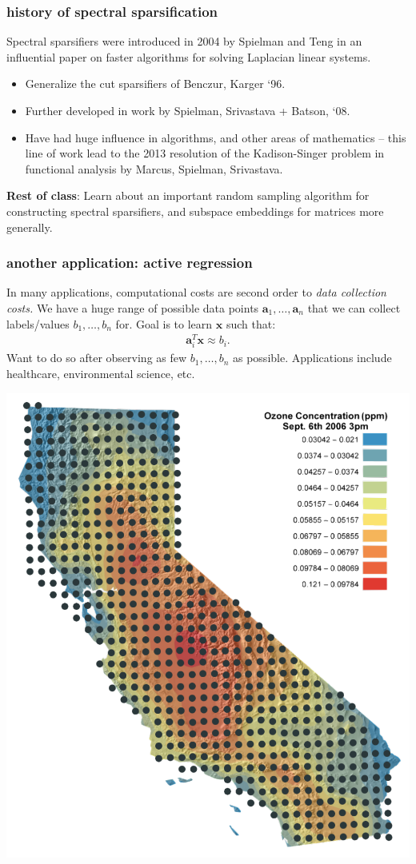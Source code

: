 \documentclass[compress]{beamer}
\newcommand{\bv}[1]{\mathbf{#1}}
\begin{document}
\begin{frame}[t]
	\frametitle{history of spectral sparsification}
	Spectral sparsifiers were introduced in 2004 by Spielman and Teng in an influential paper on faster algorithms for solving Laplacian linear systems. 
	\begin{itemize}
		\item Generalize the cut sparsifiers of Benczur, Karger `96. 
		\item Further developed in work by Spielman, Srivastava + Batson, `08.
		\item Have had huge influence in algorithms, and other areas of mathematics -- this line of work lead to the 2013 resolution of the Kadison-Singer problem in functional analysis by Marcus, Spielman, Srivastava. 
	\end{itemize}
	\alert{\textbf{Rest of class}: Learn about an important random sampling algorithm for constructing spectral sparsifiers, and subspace embeddings for matrices more generally.}
\end{frame}

\begin{frame}[t]
	\frametitle{another application: active regression}	
	In many applications, computational costs are second order to \emph{data collection costs.} We have a huge range of possible data points $\bv{a}_1, \ldots, \bv{a}_n$ that we can collect labels/values $b_1,\ldots, b_n$ for. Goal is to learn $\bv{x}$ such that:
	\begin{align*}
		\bv{a}_i^T\bv{x} \approx b_i.
	\end{align*}
	Want to do so after observing as few $b_1, \ldots, b_n$ as possible. 
	Applications include healthcare, environmental science, etc. 
	\begin{center}
		\vspace{-.5em}
		\includegraphics[width=.3\textwidth]{cali.png}
	\end{center}
\end{frame}	
\end{document}

